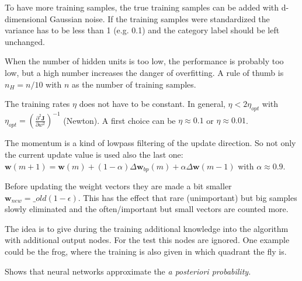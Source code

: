  To have more training samples, the true training samples can be added with d-dimensional Gaussian noise.
 If the training samples were standardized the variance has to be less than 1 (e.g. 0.1) and the category label should be left unchanged.
 
 When the number of hidden units is too low, the performance is probably too low, but a high number 
 increases the danger of overfitting. A rule of thumb is $n_H = n/10$ with $n$ as the number of training samples.
 
 The training rates $\eta$ does not have to be constant. In general,  $\eta < 2\eta_{opt}$ with $\eta_{opt}= \left( \frac{\partial^2\bm J}{\partial w^2} \right)^{-1}$ (Newton). 
 A first choice can be $\eta \approx 0.1$ or $\eta \approx 0.01$.
 
 The momentum is a kind of lowpass filtering of the update direction. So not only the current update value is used also the last one:\\
 $\bm w(m+1)= \bm w(m) +(1-\alpha) \Delta\bm w_{bp}(m) + \alpha \Delta \bm w(m-1)$ with $\alpha \approx 0.9$.
 
 Before updating the weight vectors they are made a bit smaller $\bm w_{new}= \bm _{old}(1-\epsilon)$. 
 This has the effect that rare (unimportant) but big samples slowly eliminated and the often/important but small vectors are counted more.
 
 The idea is to give during the training additional knowledge into the algorithm with additional output nodes. For the test this nodes are ignored. 
 One example could be the frog, where the training is also given in which quadrant the fly is.
 


 Shows that neural networks approximate the \em a posteriori probability\em.
 